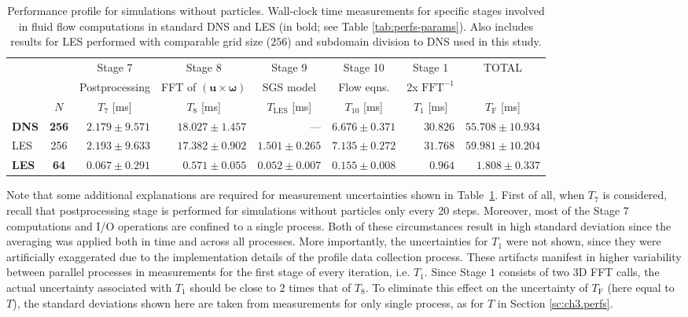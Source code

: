 \documentclass{pracamgren}
\begin{document}
\begin{table}[ht]
\centering
\scriptsize
\begin{tabular}{lcrrrrrr}
& & \multicolumn{1}{c}{Stage 7} &  \multicolumn{1}{c}{Stage 8} & \multicolumn{1}{c}{Stage 9} & \multicolumn{1}{c}{Stage 10} &  \multicolumn{1}{c}{Stage 1} & \multicolumn{1}{c}{TOTAL} \\
& & \multicolumn{1}{c}{Postprocessing} &  \multicolumn{1}{c}{FFT of $(\mathbf{u} \times \boldsymbol{\omega})$} &  \multicolumn{1}{c}{SGS model} &  \multicolumn{1}{c}{Flow eqns.} & \multicolumn{1}{c}{2x $\text{FFT}^{-1}$} & \\
& $N$ & \multicolumn{1}{c}{$T_7$ [ms]} & \multicolumn{1}{c}{$T_8$ [ms]} & \multicolumn{1}{c}{$T_{\text{LES}}$ [ms]} & \multicolumn{1}{c}{$T_{10}$ [ms]} & \multicolumn{1}{c}{$T_1$ [ms]} & \multicolumn{1}{c}{$T_{\text{F}}$ [ms]} \\ \hline
\textbf{DNS} & \textbf{256} & $2.179 \pm 9.571$ & $18.027 \pm 1.457$ & --- & $6.676 \pm 0.371$ & $30.826$ & $55.708 \pm 10.934$ \\
LES & 256 & $2.193 \pm 9.633$ & $17.382 \pm 0.902$ & $1.501 \pm 0.265$ & $7.135 \pm 0.272$ & $31.768$ & $59.981 \pm 10.204$ \\
\textbf{LES} & \textbf{64} & $0.067 \pm 0.291$ & $0.571 \pm 0.055$ & $0.052 \pm 0.007$ & $0.155 \pm 0.008$ & $0.964$ & $1.808 \pm 0.337$ \\
\end{tabular}
\caption{Performance profile for simulations without particles.
Wall-clock time measurements for specific stages involved in fluid flow computations in standard DNS and LES (in bold; see Table \ref{tab:perfs-params}).
Also includes results for LES performed with comparable grid size ($256$) and subdomain division to DNS used in this study.
}
\label{tab:pff-flow}
\end{table}

Note that some additional explanations are required for measurement uncertainties shown in Table~\ref{tab:pff-flow}.
First of all, when $T_7$ is considered, recall that postprocessing stage is performed for simulations without particles only every 20 steps.
Moreover, most of the Stage $7$ computations and I/O operations are confined to a single process.
Both of these circumstances result in high standard deviation since the averaging was applied both in time and across all processes.
More importantly, the uncertainties for $T_1$ were not shown, since they were artificially exaggerated due to the implementation details of the profile data collection process.
These artifacts manifest in higher variability between parallel processes in measurements for the first stage of every iteration, i.e. $T_1$.
Since Stage $1$ consists of two 3D FFT calls, the actual uncertainty associated with $T_1$ should be close to $2$ times that of $T_8$.
To eliminate this effect on the uncertainty of $T_{\text{F}}$ (here equal to $T$), the standard deviations shown here are taken from measurements for only single process, as for $T$ in Section \ref{sc:ch3.perfs}.  
\end{document}
